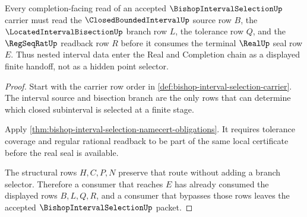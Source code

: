 \begin{theorem}
\label{thm:bishop-interval-selection-nested-interval-handoff}
Every completion-facing read of an accepted $\BishopIntervalSelectionUp$ carrier must read the $\ClosedBoundedIntervalUp$ source row $B$, the $\LocatedIntervalBisectionUp$ branch row $L$, the tolerance row $Q$, and the $\RegSeqRatUp$ readback row $R$ before it consumes the terminal $\RealUp$ seal row $E$. Thus nested interval data enter the Real and Completion chain as a displayed finite handoff, not as a hidden point selector.
\end{theorem}
\begin{proof}
Start with the carrier row order in \autoref{def:bishop-interval-selection-carrier}. The interval source and bisection branch are the only rows that can determine which closed subinterval is selected at a finite stage.

Apply \autoref{thm:bishop-interval-selection-namecert-obligations}. It requires tolerance coverage and regular rational readback to be part of the same local certificate before the real seal is available.

The structural rows $H,C,P,N$ preserve that route without adding a branch selector. Therefore a consumer that reaches $E$ has already consumed the displayed rows $B,L,Q,R$, and a consumer that bypasses those rows leaves the accepted $\BishopIntervalSelectionUp$ packet.
\end{proof}




